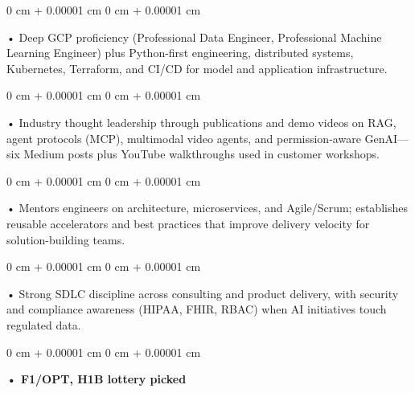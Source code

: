 \documentclass[10pt, letterpaper]{article}
\newenvironment{onecolentry}{
    \begin{adjustwidth}{
        0 cm + 0.00001 cm
    }{
        0 cm + 0.00001 cm
    }
}{
    \end{adjustwidth}
} %
\begin{document}
        \begin{onecolentry}
            • Deep GCP proficiency (Professional Data Engineer, Professional Machine Learning Engineer) plus Python-first engineering, distributed systems, Kubernetes, Terraform, and CI/CD for model and application infrastructure.
        \end{onecolentry}
        \begin{onecolentry}
            • Industry thought leadership through publications and demo videos on RAG, agent protocols (MCP), multimodal video agents, and permission-aware GenAI---six Medium posts plus YouTube walkthroughs used in customer workshops.
        \end{onecolentry}
        \begin{onecolentry}
            • Mentors engineers on architecture, microservices, and Agile/Scrum; establishes reusable accelerators and best practices that improve delivery velocity for solution-building teams.
        \end{onecolentry}
        \begin{onecolentry}
            • Strong SDLC discipline across consulting and product delivery, with security and compliance awareness (HIPAA, FHIR, RBAC) when AI initiatives touch regulated data.
        \end{onecolentry}
        \begin{onecolentry}
                \textbf{• F1/OPT, H1B lottery picked}
        \end{onecolentry}

    \vspace{2 pt }
\end{document}
